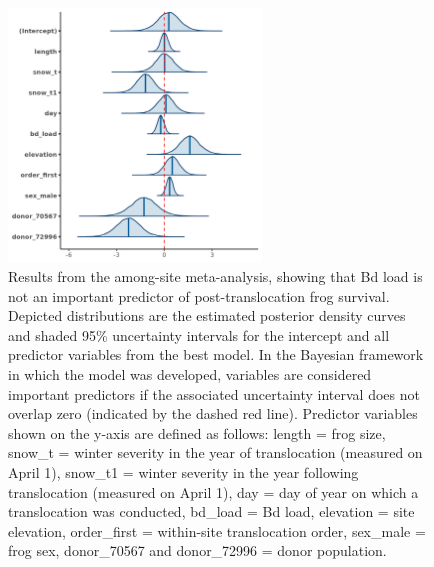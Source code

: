 \documentclass[9pt,twoside,lineno]{pnas-new}
\begin{document}
\begin{figure}

{\centering \includegraphics[width=0.60\textwidth]{figures/mcmc_areas_m1d.png}

}

\caption{\label{fig-survival-postdens}Results from the among-site
meta-analysis, showing that Bd load is not an important predictor of
post-translocation frog survival. Depicted distributions are the
estimated posterior density curves and shaded 95\% uncertainty intervals
for the intercept and all predictor variables from the best model. In
the Bayesian framework in which the model was developed, variables are
considered important predictors if the associated uncertainty interval
does not overlap zero (indicated by the dashed red line). Predictor
variables shown on the y-axis are defined as follows: length = frog
size, snow\_t = winter severity in the year of translocation (measured
on April 1), snow\_t1 = winter severity in the year following
translocation (measured on April 1), day = day of year on which a
translocation was conducted, bd\_load = Bd load, elevation = site
elevation, order\_first = within-site translocation order, sex\_male =
frog sex, donor\_70567 and donor\_72996 = donor population.}

\end{figure}\clearpage

\newpage
\end{document}
